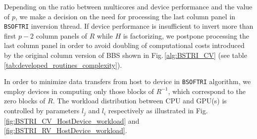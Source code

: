 \documentclass{llncs}
\newcommand{\Bsoftri}{\texttt{BSOFTRI}\xspace}
\begin{document}
Depending on the ratio between multicores and device performance and the value of $p$, 
we make a decision on the need for processing 
the last column panel in \Bsoftri inversion thread.
If device performance is insufficient to invert 
more than first $p-2$ column panels of $R$
while $H$ is factorizing, 
we postpone processing the last column panel 
in order to avoid doubling of computational costs 
introduced by the original column version of BBS shown in Fig.\,\ref{alg:BSTRI_CV}
(see table\,\ref{tab:developed_routines_complexity}).

In order to minimize data transfers from host to device 
in \Bsoftri algorithm,
we employ devices in computing only those blocks of $R^{-1}$,
which correspond to the zero blocks of $R$. 
The workload distribution between CPU and GPU(s) is 
controlled by parameters $l_j$ and $l_i$ respectively
as illustrated in Fig.\,\ref{fig:BSTRI_CV_HostDevice_workload} and \ref{fig:BSTRI_RV_HostDevice_workload}.
\end{document}
